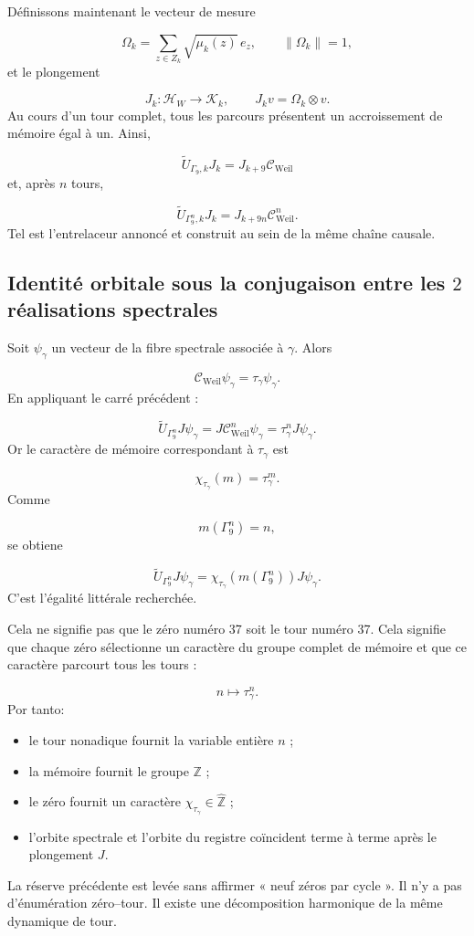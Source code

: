 Définissons maintenant le vecteur de mesure\par
\[
\Omega_k
=
\sum_{z\in Z_k}
\sqrt{\mu_k(z)}\,e_z,
\qquad
\|\Omega_k\|=1,
\]
et le plongement\par
\[
J_k:\mathcal H_W\longrightarrow\mathscr K_k,
\qquad
J_kv=\Omega_k\otimes v.
\]
Au cours d'un tour complet, tous les parcours présentent un accroissement de mémoire égal à un. Ainsi,\par
\[
\boxed{
\widetilde U_{\Gamma_9,k}J_k
=
J_{k+9}\mathcal C_{\mathrm{Weil}}
}
\]
et, après \(n\) tours,\par
\[
\boxed{
\widetilde U_{\Gamma_9^n,k}J_k
=
J_{k+9n}\mathcal C_{\mathrm{Weil}}^n.
}
\]
Tel est l'entrelaceur annoncé et construit au sein de la même chaîne causale.\par
{}
\subsection{Identité orbitale sous la conjugaison entre les \(2\) réalisations spectrales}
Soit \(\psi_\gamma\) un vecteur de la fibre spectrale associée à \(\gamma\). Alors\par
\[
\mathcal C_{\mathrm{Weil}}\psi_\gamma
=
\tau_\gamma\psi_\gamma.
\]
En appliquant le carré précédent :\par
\[
\widetilde U_{\Gamma_9^n}J\psi_\gamma
=
J\mathcal C_{\mathrm{Weil}}^n\psi_\gamma
=
\tau_\gamma^nJ\psi_\gamma.
\]
Or le caractère de mémoire correspondant à \(\tau_\gamma\) est\par
\[
\chi_{\tau_\gamma}(m)
=
\tau_\gamma^m.
\]
Comme\par
\[
m(\Gamma_9^n)=n,
\]
se obtiene\par
\[
\boxed{
\widetilde U_{\Gamma_9^n}J\psi_\gamma
=
\chi_{\tau_\gamma}
\!\left(m(\Gamma_9^n)\right)
J\psi_\gamma.
}
\]
C'est l'égalité littérale recherchée.\par
Cela ne signifie pas que le zéro numéro 37 soit le tour numéro 37. Cela signifie que chaque zéro sélectionne un caractère du groupe complet de mémoire et que ce caractère parcourt tous les tours :\par
\[
n\longmapsto\tau_\gamma^n.
\]
Por tanto:\par
\begin{itemize}
\item le tour nonadique fournit la variable entière \(n\) ;
\item la mémoire fournit le groupe \(\mathbb Z\) ;
\item le zéro fournit un caractère \(\chi_{\tau_\gamma}\in\widehat{\mathbb Z}\) ;
\item l'orbite spectrale et l'orbite du registre coïncident terme à terme après le plongement \(J\).
\end{itemize}
La réserve précédente est levée sans affirmer « neuf zéros par cycle ». Il n'y a pas d'énumération zéro–tour. Il existe une décomposition harmonique de la même dynamique de tour.\par
{}
